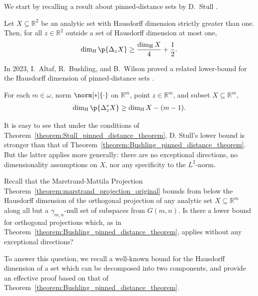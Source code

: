 We start by recalling a result about pinned-distance sets by D.~Stull \cite{Stu22_pinned}. 
\begin{theorem} 
    \label{theorem:Stull_pinned_distance_theorem}
    Let $X \subseteq \mathbb{R}^2$ be an analytic set with Hausdorff dimension strictly greater than one. Then, for all $z \in \mathbb{R}^2$ outside a set of Hausdorff dimension at most one, 
    \begin{align*}
        \dim_{\operatorname{H}}\p{\Delta_z X} \geq \frac{\dim_{\operatorname{H}}X}{4} + \frac{1}{2}.
    \end{align*}
\end{theorem}

In 2023, I.~Altaf, R.~Bushling, and B.~Wilson proved a related lower-bound for the Hausdorff dimension of pinned-distance sets \cite{ABW23}.

\begin{theorem} \label{theorem:Bushling_pinned_distance_theorem}
    For each $m \in \omega$, norm $\norm[*]{\cdot}$ on $\mathbb{R}^m$, point $z \in \mathbb{R}^m$, and subset $X \subseteq \mathbb{R}^m$,
    \begin{align*}
        \dim_{\operatorname{H}}\p{\Delta^*_z X} \geq \dim_{\operatorname{H}}X - (m - 1).
    \end{align*}
\end{theorem}

It is easy to see that under the conditions of Theorem~\ref{theorem:Stull_pinned_distance_theorem}, D. Stull's lower bound is stronger than that of Theorem~\ref{theorem:Bushling_pinned_distance_theorem}. But the latter applies more generally: there are no exceptional directions, no dimensionality assumptions on $X$, nor any specificity to the $L^2$-norm.

Recall that the Marstrand-Mattila Projection Theorem~\ref{theorem:marstrand_projection_original} bounds from below the Hausdorff dimension of the orthogonal projection of any analytic set $X \subseteq \mathbb{R}^m$ along all but a $\gamma_{m, n}$-null set of subspaces from $G(m, n)$. Is there a lower bound for orthogonal projections which, as in Theorem~\ref{theorem:Bushling_pinned_distance_theorem}, applies without any exceptional directions?

To answer this question, we recall a well-known bound for the Hausdorff dimension of a set which can be decomposed into two components, and provide an effective proof based on that of Theorem~\ref{theorem:Bushling_pinned_distance_theorem}.  

